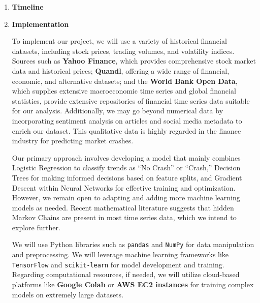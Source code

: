 \documentclass[12pt, letterpaper]{article}
\begin{document}
\begin{enumerate}
    \item [] \textbf{Timeline}
        
        
    \item [] \textbf{Implementation} %

    


    To implement our project, we will use a variety of historical financial datasets, including stock prices, trading volumes, and volatility indices. Sources such as \textbf{Yahoo Finance}, which provides comprehensive stock market data and historical prices; \textbf{Quandl}, offering a wide range of financial, economic, and alternative datasets; and the \textbf{World Bank Open Data}, which supplies extensive macroeconomic time series and global financial statistics, provide extensive repositories of financial time series data suitable for our analysis. Additionally, we may go beyond numerical data by incorporating sentiment analysis on articles and social media metadata to enrich our dataset. This qualitative data is highly regarded in the finance industry for predicting market crashes.

Our primary approach involves developing a model that mainly combines Logistic Regression to classify trends as ``No Crash'' or ``Crash,'' Decision Trees for making informed decisions based on feature splits, and Gradient Descent within Neural Networks for effective training and optimization. However, we remain open to adapting and adding more machine learning models as needed. Recent mathematical literature suggests that hidden Markov Chains are present in most time series data, which we intend to explore further.

We will use Python libraries such as \texttt{pandas} and \texttt{NumPy} for data manipulation and preprocessing. We will leverage machine learning frameworks like \texttt{TensorFlow} and \texttt{scikit-learn} for model development and training. Regarding computational resources, if needed, we will utilize cloud-based platforms like \textbf{Google Colab} or \textbf{AWS EC2 instances} for training complex models on extremely large datasets. 



    





    
\end{enumerate}
\end{document}
